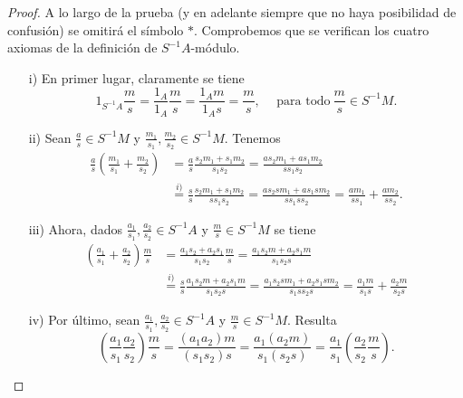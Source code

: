 \documentclass[../main.tex]{subfiles}
\begin{document}
\begin{remark}
\begin{proof}
	A lo largo de la prueba (y en adelante siempre que no haya posibilidad de confusión) se omitirá el símbolo $\ast$. Comprobemos que se verifican los cuatro axiomas de la definición de $S^{-1}A$-módulo.
	\begin{itemize}
		\item[i)] En primer lugar, claramente se tiene $$1_{S^{-1}A}\frac{m}{s}=\frac{1_A}{1_A}\frac{m}{s}=\frac{1_Am}{1_As}=\frac{m}{s},\hspace{15pt}\text{para todo}\ \frac{m}{s}\in S^{-1}M.$$
		\item[ii)] Sean $\frac{a}{s}\in S^{-1}M$ y $\frac{m_1}{s_1},\frac{m_2}{s_2}\in S^{-1}M$. Tenemos
		\begin{align*}
		\frac{a}{s}\left(\frac{m_1}{s_1}+\frac{m_2}{s_2}\right)&=\frac{a}{s}\frac{s_2m_1+s_1m_2}{s_1s_2}=\frac{as_2m_1+as_1m_2}{ss_1s_2}\\
		&\overset{i)}{=}\frac{s}{s}\frac{s_2m_1+s_1m_2}{ss_1s_2}=\frac{as_2sm_1+as_1sm_2}{ss_1ss_2}=\frac{am_1}{ss_1}+\frac{am_2}{ss_2}.
		\end{align*}
		\item[iii)] Ahora, dados $\frac{a_1}{s_1},\frac{a_2}{s_2}\in S^{-1}A$ y $\frac{m}{s}\in S^{-1}M$ se tiene
		\begin{align*}
		\left(\frac{a_1}{s_1}+\frac{a_2}{s_2}\right)\frac{m}{s}&=\frac{a_1s_2+a_2s_1}{s_1s_2}\frac{m}{s}=\frac{a_1s_2m+a_2s_1m}{s_1s_2s}\\
		&\overset{i)}{=}\frac{s}{s}\frac{a_1s_2m+a_2s_1m}{s_1s_2s}=\frac{a_1s_2sm_1+a_2s_1sm_2}{s_1ss_2s}=\frac{a_1m}{s_1s}+\frac{a_2m}{s_2s}
		\end{align*}
		\item[iv)] Por último, sean $\frac{a_1}{s_1},\frac{a_2}{s_2}\in S^{-1}A$ y $\frac{m}{s}\in S^{-1}M$. Resulta
		$$\left(\frac{a_1}{s_1}\frac{a_2}{s_2}\right)\frac{m}{s}=\frac{(a_1a_2)m}{(s_1s_2)s}=\frac{a_1(a_2m)}{s_1(s_2s)}=\frac{a_1}{s_1}\left(\frac{a_2}{s_2}\frac{m}{s}\right).$$
	\end{itemize}
\end{proof}
\end{remark}
\end{document}

